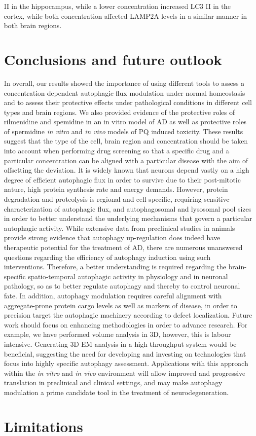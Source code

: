II in the hippocampus, while a lower concentration increased LC3 II in the cortex, while both concentration affected LAMP2A levels in a similar manner in both brain regions. 

\section{Conclusions and future outlook}
In overall, our results showed the importance of using different tools to assess a concentration dependent autophagic flux modulation under normal homeostasis and to assess their protective effects under pathological conditions in different cell types and brain regions. We also provided evidence of the protective roles of rilmenidine and spemidine in an in vitro model of AD as well as protective roles of spermidine \textit{in vitro} and \textit{in vivo} models of PQ induced toxicity. These results suggest that the type of the cell, brain region and concentration should be taken into account when performing drug screening so that a specific drug and a particular concentration can be aligned with a particular disease with the aim of offsetting the deviation. It is widely known that neurons depend vastly on a high degree of efficient autophagic flux in order to survive due to their post-mitotic nature, high protein synthesis rate and energy demands. However, protein degradation and proteolysis is regional and cell-specific, requiring sensitive characterization of autophagic flux, and autophagosomal and lysosomal pool sizes in order to better understand the underlying mechanisms that govern a particular autophagic activity. While extensive data from preclinical studies in animals provide strong evidence that autophagy up-regulation does indeed have therapeutic potential for the treatment of AD, there are numerous unanswered questions regarding the efficiency of autophagy induction using such interventions. Therefore, a better understanding is required regarding the brain-specific spatio-temporal autophagic activity in physiology and in neuronal pathology, so as to better regulate autophagy and thereby to control neuronal fate. In addition, autophagy modulation requires careful alignment with aggregate-prone protein cargo levels as well as markers of disease, in order to precision target the autophagic machinery according to defect localization. Future work should focus on enhancing methodologies in order to advance research. For example, we have performed volume analysis in 3D, however, this is labour intensive. Generating 3D EM analysis in a high throughput system would be beneficial, suggesting the need for developing and investing on technologies that focus into highly specific autophagy assessment. Applications with this approach within the \textit{in vitro} and \textit{in vivo} environment will allow improved and progressive translation in preclinical and clinical settings, and may make autophagy modulation a prime candidate tool in the treatment of neurodegeneration. 

\section{Limitations}